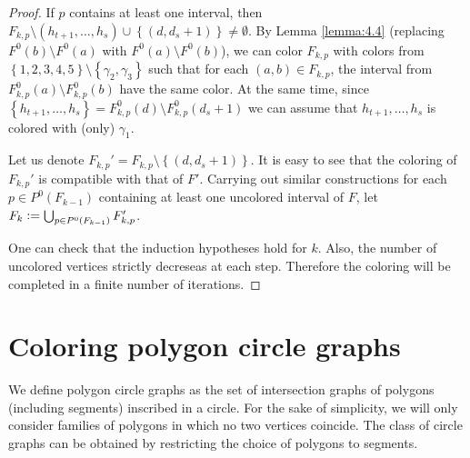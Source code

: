 \documentclass[12pt]{article}
\theoremstyle{definition}
\newcommand{\defeq}{\vcentcolon=}
\begin{document}
\begin{proof}
        If $p$ contains at least one interval,
        then $F_{k, p} \setminus \left(h_{t+1},
        \ldots, h_{s}\right) \cup 
        \left\{\left(d, d_{s} + 1\right)\right\}
        \neq \emptyset$.
        By Lemma \ref{lemma:4.4}
        (replacing $F^{0}\left(b\right)
        \setminus F^{0}\left(a\right)$
        with $F^{0}\left(a\right)
        \setminus F^{0}\left(b\right)$),
        we can color $F_{k, p}$ 
        with colors from
        $\left\{1,2,3,4,5\right\} \setminus 
        \left\{\gamma_2, \gamma_3\right\}$
        such that
        for each
        $\left(a, b\right) \in 
        F_{k, p}$,
        the interval from
        $F^{0}_{k, p}\left(a\right) \setminus 
        F^{0}_{k, p}\left(b\right)$
        have the same color.
        At the same time,
        since $\left\{h_{t+1},
        \ldots, h_{s}\right\}
        = F^{0}_{k, p}\left(d\right)
        \setminus F^{0}_{k, p}\left(d_{s} + 1\right)$
        we can assume that 
        $h_{t+1}, \ldots,
        h_{s}$ is colored 
        with (only) $\gamma_1$.
        
        Let us denote $F_{k, p}' = 
        F_{k, p} \setminus \left\{
        \left(d, d_{s} + 1\right)\right\}$.
        It is easy to see that the coloring of
        $F_{k, p}'$ is compatible
        with that of
        $F'$.
        Carrying out similar constructions
        for each $p \in P^{0}\left(F_{k-1}\right)$
        containing at least one uncolored
        interval of $F$, let
        $F_{k} \defeq \bigcup_{p \in 
        P^{0}\left(F_{k-1}\right)} F_{k, p}'$.

        One can check that the 
        induction hypotheses hold
        for $k$.
        Also, the number of uncolored
        vertices strictly decreseas 
        at each step. Therefore
        the coloring will be 
        completed in a finite
        number of iterations.
    \end{proof}
    
    \section{Coloring polygon circle graphs}

    We define polygon circle
    graphs as the set of intersection
    graphs of polygons
    (including segments)
    inscribed in a circle.
    For the sake of simplicity,
    we will only consider
    families of polygons
    in which no two
    vertices coincide.
    The class of circle
    graphs can be obtained
    by restricting the
    choice of polygons
    to segments.
\end{document}

